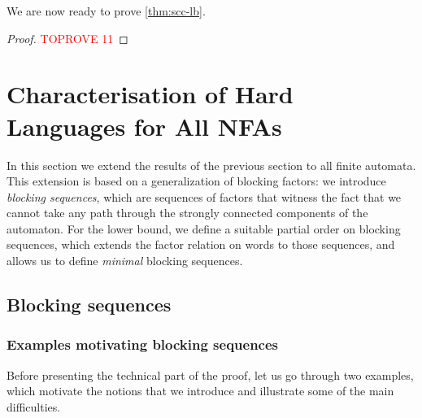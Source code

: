 \documentclass[letterpaper, USenglish, cleveref, autoref, thm-restate, numberwithinsect]{lipics-v2021}
\theoremstyle{theorem}
\theoremstyle{definition}
\begin{document}
We are now ready to prove \cref{thm:scc-lb}.
\begin{proof}\textcolor{red}{TOPROVE 11}\end{proof}
 
\section{Characterisation of Hard Languages for All NFAs}
\label{sec:general}
In this section we extend the results of the previous section to all finite automata.
This extension is based on a generalization of blocking factors: we introduce \emph{blocking sequences}, which are sequences of factors that witness the fact that we cannot take any path through the strongly connected components of the automaton.
For the lower bound, we define a suitable partial order on blocking sequences, which extends the factor relation on words to those sequences, and allows us to define \emph{minimal} blocking sequences.

\subsection{Blocking sequences}\label{sec:blocking-seq}

\subsubsection{Examples motivating blocking sequences}

Before presenting the technical part of the proof, let us go through two examples, which motivate the notions that we introduce and illustrate some of the main difficulties.
\end{document}

